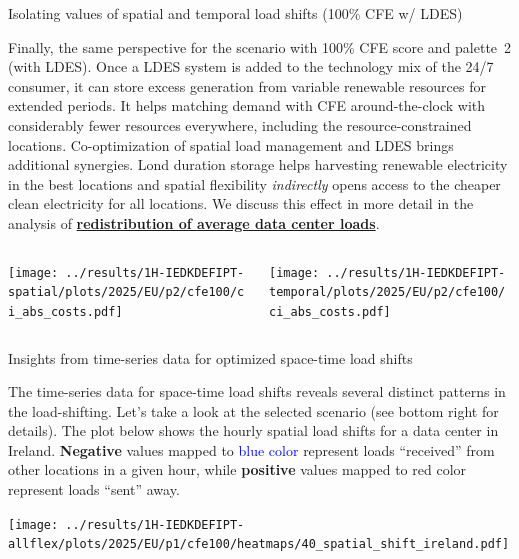 \begin{frame}{Isolating values of spatial and temporal load shifts (100\% CFE w/ LDES)}
\label{isolated-p2}

  {\footnotesize

  Finally, the same perspective for the scenario with \alert{100\% CFE score and palette~2 (with LDES)}. 
  Once a LDES system is added to the technology mix of the 24/7 consumer, it 
  can store excess generation from variable renewable resources for extended periods. It helps matching demand with CFE around-the-clock with considerably fewer resources everywhere, including the resource-constrained locations. Co-optimization of spatial load management and LDES brings additional synergies. Lond duration storage helps harvesting renewable electricity in the best locations and spatial flexibility \textit{indirectly} opens access to the cheaper clean electricity for all locations. We discuss this effect in more detail in the analysis of {\bf \hyperlink{redistribution-p2}{redistribution of average data center loads}}.

  \begin{columns}
    \begin{column}{7cm}
    \texttt{[image: ../results/1H-IEDKDEFIPT-spatial/plots/2025/EU/p2/cfe100/ci\_abs\_costs.pdf]}
    \end{column}
    
    \begin{column}{7cm}
    \texttt{[image: ../results/1H-IEDKDEFIPT-temporal/plots/2025/EU/p2/cfe100/ci\_abs\_costs.pdf]}
    \end{column}
  \end{columns}

  }
\end{frame}




\begin{frame}{Insights from time-series data for optimized space-time load shifts}

  {\footnotesize

  The time-series data for space-time load shifts reveals several distinct patterns in the load-shifting. Let's take a look at the selected scenario (see bottom right for details). The plot below shows \alert{ the hourly spatial load shifts} for a data center in Ireland. {\bf Negative} values mapped to \textcolor{blue}{blue color} represent loads \enquote{received} from other locations in a given hour, while {\bf positive} values mapped to \textcolor{TUred}{red color} represent loads \enquote{sent} away. 

  \texttt{[image: ../results/1H-IEDKDEFIPT-allflex/plots/2025/EU/p1/cfe100/heatmaps/40\_spatial\_shift\_ireland.pdf]}
  \vspace{0.3cm}

  }
  
\end{frame}


